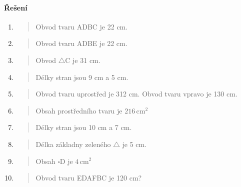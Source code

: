 \paragraph{Řešení}
\begin{enumerate}
    \item
    \begin{quote}
        Obvod tvaru ADBC je 22 cm.
    \end{quote}

    \item
    \begin{quote}
        Obvod tvaru ADBE je 22 cm.
    \end{quote}

    \item
    \begin{quote}
        Obvod $\triangle$C je 31 cm.
    \end{quote}

    \item
    \begin{quote}
        Délky stran jsou 9 cm a 5 cm.
    \end{quote}

    \item
    \begin{quote}
        Obvod tvaru uprostřed je 312 cm.
        Obvod tvaru vpravo je 130 cm.
    \end{quote}

    \item
    \begin{quote}
        Obsah prostředního tvaru je $216\,\text{cm}^{2}$
    \end{quote}

    \item
    \begin{quote}
        Délky stran jsou 10 cm a 7 cm.
    \end{quote}

    \item
    \begin{quote}
        Délka základny zeleného $\triangle$ je 5 cm.
    \end{quote}

    \item
    \begin{quote}
        Obsah $\square$D je $4\,\text{cm}^{2}$
    \end{quote}

    \item
    \begin{quote}
        Obvod tvaru EDAFBC je 120 cm?
    \end{quote}
\end{enumerate}


